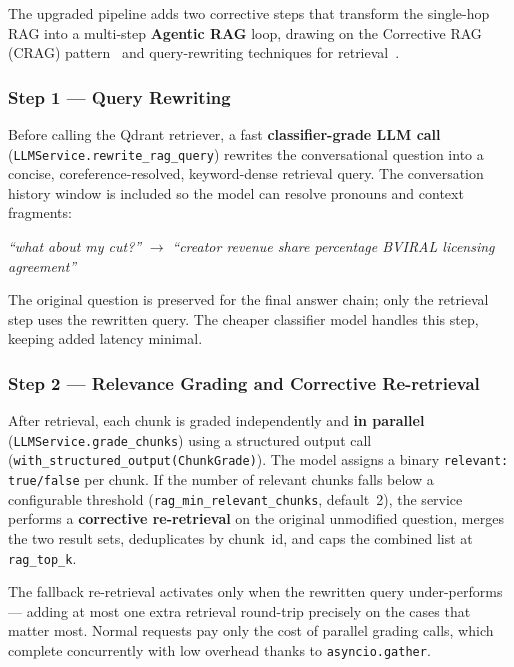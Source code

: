 The upgraded pipeline adds two corrective steps that transform the single-hop RAG into a
multi-step \textbf{Agentic RAG} loop, drawing on the Corrective RAG (CRAG)
pattern~\cite{crag_2024} and query-rewriting techniques for
retrieval~\cite{query_rewriting_rag}.

\subsubsection{Step 1 — Query Rewriting}

Before calling the Qdrant retriever, a fast \textbf{classifier-grade LLM call}
(\texttt{LLMService.rewrite\_rag\_query}) rewrites the conversational question into a
concise, coreference-resolved, keyword-dense retrieval query. The conversation history window
is included so the model can resolve pronouns and context fragments:

\begin{center}
\textit{``what about my cut?''} \quad $\longrightarrow$ \quad
\textit{``creator revenue share percentage BVIRAL licensing agreement''}
\end{center}

The original question is preserved for the final answer chain; only the retrieval step uses the
rewritten query. The cheaper classifier model handles this step, keeping added latency minimal.

\subsubsection{Step 2 — Relevance Grading and Corrective Re-retrieval}

After retrieval, each chunk is graded independently and \textbf{in parallel}
(\texttt{LLMService.grade\_chunks}) using a structured output call
(\texttt{with\_structured\_output(ChunkGrade)}). The model assigns a binary
\texttt{relevant: true/false} per chunk. If the number of relevant chunks falls below a
configurable threshold (\texttt{rag\_min\_relevant\_chunks}, default~2), the service performs a
\textbf{corrective re-retrieval} on the original unmodified question, merges the two result
sets, deduplicates by chunk~id, and caps the combined list at \texttt{rag\_top\_k}.

The fallback re-retrieval activates only when the rewritten query under-performs — adding at
most one extra retrieval round-trip precisely on the cases that matter most. Normal requests pay
only the cost of parallel grading calls, which complete concurrently with low overhead thanks to
\texttt{asyncio.gather}.

